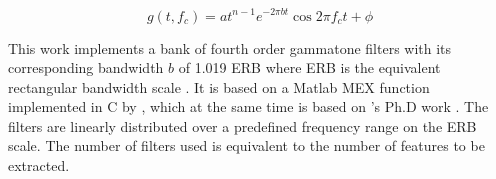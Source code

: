 \begin{equation}
    g(t, f_c) = a t^{n-1}e^{-2 \pi b t} \cos{2 \pi f_c t + \phi}
    \label{eq:gammatone-filter-impulse}
\end{equation}

This work implements a bank of fourth order gammatone filters with its
corresponding bandwidth $b$ of 1.019 ERB where ERB is the equivalent
rectangular bandwidth scale \cite{GLASBERG1990103}. It is based on a Matlab MEX
function implemented in C by \citeauthor{CorrelogramMa2007}
\cite{CorrelogramMa2007}, which at the same time is based on
\citeauthor{Cooke1993ModellingAP}'s Ph.D work \cite{Cooke1993ModellingAP}. The
filters are linearly distributed over a predefined frequency range on the ERB
scale. The number of filters used is equivalent to the number of features to be
extracted. 